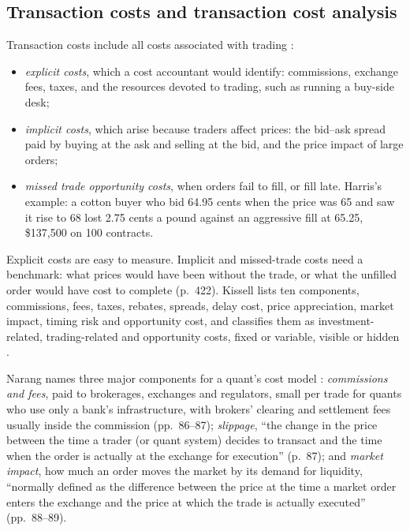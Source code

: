 \subsection{Transaction costs and transaction cost analysis}

\begin{qfdefinition}\label{def:transaction-costs}
 Transaction costs include all costs associated with trading \citep[sec.~21.1, pp.~421--422]{alpha-harris}:
\begin{itemize}
\item \emph{explicit costs}, which a cost accountant would identify: commissions, exchange fees, taxes, and the resources devoted to trading, such as running a buy-side desk;
\item \emph{implicit costs}, which arise because traders affect prices: the bid--ask spread paid by buying at the ask and selling at the bid, and the price impact of large orders;
\item \emph{missed trade opportunity costs}, when orders fail to fill, or fill late. Harris's example: a cotton buyer who bid 64.95 cents when the price was 65 and saw it rise to 68 lost 2.75 cents a pound against an aggressive fill at 65.25, \$137{,}500 on 100 contracts.
\end{itemize}
Explicit costs are easy to measure. Implicit and missed-trade costs need a benchmark: what prices would have been without the trade, or what the unfilled order would have cost to complete (p.~422). Kissell lists ten components, commissions, fees, taxes, rebates, spreads, delay cost, price appreciation, market impact, timing risk and opportunity cost, and classifies them as investment-related, trading-related and opportunity costs, fixed or variable, visible or hidden \citep[chap.~3, pp.~89--95, Tables~3.1--3.2]{s7-kissellscience}.

Narang names three major components for a quant's cost model \citep[chap.~5, ``Transaction Cost Models'', sec.~5.1, pp.~86--91]{s7-narang}: \emph{commissions and fees}, paid to brokerages, exchanges and regulators, small per trade for quants who use only a bank's infrastructure, with brokers' clearing and settlement fees usually inside the commission (pp.~86--87); \emph{slippage}, ``the change in the price between the time a trader (or quant system) decides to transact and the time when the order is actually at the exchange for execution'' (p.~87); and \emph{market impact}, how much an order moves the market by its demand for liquidity, ``normally defined as the difference between the price at the time a market order enters the exchange and the price at which the trade is actually executed'' (pp.~88--89).


\end{qfdefinition}
